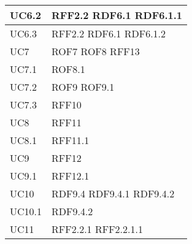 \documentclass[../AnalisideiRequisiti.tex]{subfiles}
\begin{document}
\begin{longtable}{| p{4cm} | p{4cm} |}
		\hline
		\newline UC6.2 &  \newline RFF2.2 \newline RDF6.1 \newline RDF6.1.1 \\[1em]
		\hline
		\newline UC6.3 &  \newline RFF2.2 \newline RDF6.1 \newline RDF6.1.2 \\[1em]
		\hline
		\newline UC7 &  \newline ROF7 \newline ROF8 \newline RFF13 \\[1em]
		\hline
		\newline UC7.1 &  \newline ROF8.1 \\[1em]
		\hline
		\newline UC7.2 &  \newline ROF9 \newline ROF9.1 \\[1em]
		\hline
		\newline UC7.3 &  \newline RFF10 \\[1em]
		\hline
		\newline UC8 &  \newline RFF11 \\[1em]
		\hline
		\newline UC8.1 &  \newline RFF11.1 \\[1em]
		\hline
		\newline UC9 &  \newline RFF12 \\[1em]
		\hline
		\newline UC9.1 &  \newline RFF12.1 \\[1em]
		\hline
		\newline UC10 &  \newline RDF9.4 \newline RDF9.4.1 \newline RDF9.4.2 \\[1em]
		\hline
		\newline UC10.1 &  \newline RDF9.4.2 \\[1em]
		\hline
		\newline UC11 &  \newline RFF2.2.1 \newline RFF2.2.1.1\\[1em]

\end{longtable}
\end{document}

